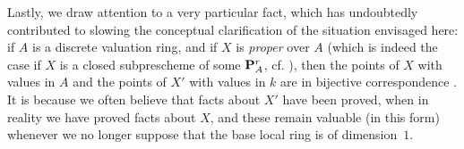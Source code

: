 \begin{env}[3.7.3]
\label{1.3.7.3}
Lastly, we draw attention to a very particular fact, which has undoubtedly contributed to slowing the conceptual clarification of the situation envisaged here: if $A$ is a discrete valuation ring, and if $X$ is \emph{proper} over $A$ (which is indeed the case if $X$ is a closed subprescheme of some $\mathbf{P}_A^r$, cf. ), then the points of $X$ with values in $A$ and the points of $X'$ with values in $k$ are in bijective correspondence .
It is because we often believe that facts about $X'$ have been proved, when in reality we have proved facts about $X$, and these remain valuable (in this form) whenever we no longer suppose that the base local ring is of dimension~$1$.
\end{env}

